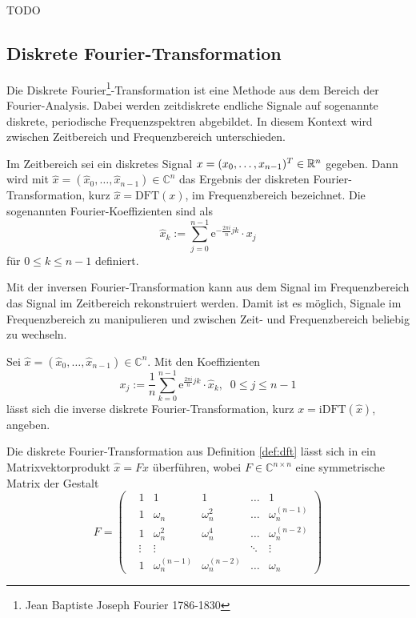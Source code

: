 \begin{bsp}
    \label{bsp:Kzeropad}
    TODO
\end{bsp}

\subsection{Diskrete Fourier-Transformation}
Die Diskrete Fourier\footnote{Jean Baptiste Joseph Fourier 1786-1830}-Transformation ist eine Methode aus dem Bereich der Fourier-Analysis. Dabei werden zeitdiskrete endliche Signale auf sogenannte diskrete, periodische Frequenzspektren abgebildet. In diesem Kontext wird zwischen Zeitbereich und Frequenzbereich unterschieden.

\begin{defi}
    \label{def:dft}
    Im Zeitbereich sei ein diskretes Signal $x=(x_0, \ldots, x_{n-1})^T \in \mathbb{R}^n$ gegeben. Dann wird mit $\hat{x}=(\hat{x}_0, \ldots, \hat{x}_{n-1}) \in \mathbb{C}^n$ das Ergebnis der diskreten Fourier-Transformation, kurz $\hat{x}=\mathrm{DFT}(x)$, im Frequenzbereich bezeichnet. Die sogenannten Fourier-Koeffizienten sind als 
    \begin{equation*}
        \hat{x}_k:=\sum_{j=0}^{n-1} \mathrm{e}^{- \frac{2 \pi i}{n} j k} \cdot x_j
    \end{equation*}
    für $0 \leq k \leq n-1$ definiert.
\end{defi}
Mit der inversen Fourier-Transformation kann aus dem Signal im Frequenzbereich das Signal im Zeitbereich rekonstruiert werden. Damit ist es möglich, Signale im Frequenzbereich zu manipulieren und zwischen Zeit- und Frequenzbereich beliebig zu wechseln.
\begin{defi}
    Sei $\hat{x}=(\hat{x}_0, \ldots, \hat{x}_{n-1}) \in \mathbb{C}^n$. Mit den Koeffizienten
    \begin{equation*}
        x_j:= \frac{1}{n} \sum_{k=0}^{n-1} \mathrm{e}^{\frac{2 \pi i}{n} j k} \cdot \hat{x}_k, \; \; 0 \leq j \leq n-1
    \end{equation*}
    lässt sich die inverse diskrete Fourier-Transformation, kurz $x=\mathrm{iDFT}(\hat{x})$, angeben.
\end{defi}
Die diskrete Fourier-Transformation aus Definition \ref{def:dft} lässt sich in ein Matrixvektorprodukt $\hat{x}=Fx$ überführen, wobei $F \in \mathbb{C}^{n \times n}$ eine symmetrische Matrix der Gestalt
\begin{equation}
    \label{eq:FM}
    F=\begin{pmatrix}
        &1 &1 &1 &\ldots &1 \\
        &1 &\omega_n &\omega_n^2 &\ldots &\omega_n^{(n-1)} \\
        &1 &\omega_n^2 &\omega_n^4 &\ldots &\omega_n^{(n-2)} \\
        &\vdots &\vdots & &\ddots &\vdots \\
        &1 &\omega_n^{(n-1)} &\omega_n^{(n-2)}  &\ldots &\omega_n
    \end{pmatrix}
\end{equation}
